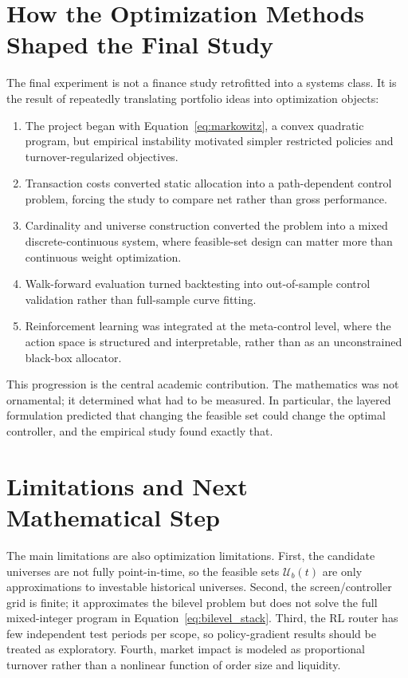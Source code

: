\documentclass[11pt,a4paper]{article}
\begin{document}
\section{How the Optimization Methods Shaped the Final Study}
The final experiment is not a finance study retrofitted into a systems class. It is the result of repeatedly translating portfolio ideas into optimization objects:
\begin{enumerate}[leftmargin=1.5em]
    \item The project began with Equation~\eqref{eq:markowitz}, a convex quadratic program, but empirical instability motivated simpler restricted policies and turnover-regularized objectives.
    \item Transaction costs converted static allocation into a path-dependent control problem, forcing the study to compare net rather than gross performance.
    \item Cardinality and universe construction converted the problem into a mixed discrete-continuous system, where feasible-set design can matter more than continuous weight optimization.
    \item Walk-forward evaluation turned backtesting into out-of-sample control validation rather than full-sample curve fitting.
    \item Reinforcement learning was integrated at the meta-control level, where the action space is structured and interpretable, rather than as an unconstrained black-box allocator.
\end{enumerate}
This progression is the central academic contribution. The mathematics was not ornamental; it determined what had to be measured. In particular, the layered formulation predicted that changing the feasible set could change the optimal controller, and the empirical study found exactly that.

\section{Limitations and Next Mathematical Step}
The main limitations are also optimization limitations. First, the candidate universes are not fully point-in-time, so the feasible sets $\mathcal{U}_b(t)$ are only approximations to investable historical universes. Second, the screen/controller grid is finite; it approximates the bilevel problem but does not solve the full mixed-integer program in Equation~\eqref{eq:bilevel_stack}. Third, the RL router has few independent test periods per scope, so policy-gradient results should be treated as exploratory. Fourth, market impact is modeled as proportional turnover rather than a nonlinear function of order size and liquidity.
\end{document}
